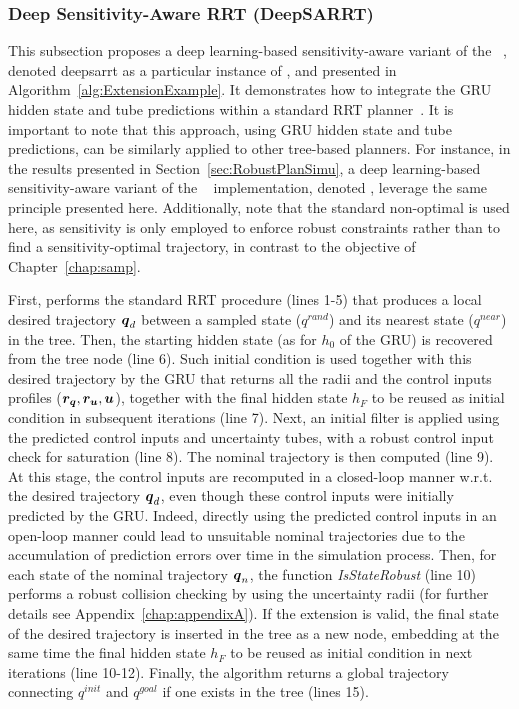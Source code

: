 \subsubsection{Deep Sensitivity-Aware RRT (DeepSARRT)}

This subsection proposes a deep learning-based sensitivity-aware variant of the ~\cite{cRRT}, denoted \gls{deepsarrt} as a particular instance of , and presented in Algorithm~\ref{alg:ExtensionExample}. 
It demonstrates how to integrate the GRU hidden state and tube predictions within a standard RRT planner~\cite{cRRT}.
It is important to note that this approach, using GRU hidden state and tube predictions, can be similarly applied to other tree-based planners. 
For instance, in the results presented in Section~\ref{sec:RobustPlanSimu}, a deep learning-based sensitivity-aware variant of the ~\cite{cRRTstar} implementation, denoted , leverage the same principle presented here.
Additionally, note that the standard non-optimal  is used here, as sensitivity is only employed to enforce robust constraints rather than to find a sensitivity-optimal trajectory, in contrast to the objective of Chapter~\ref{chap:samp}.

First,  performs the standard RRT procedure (lines 1-5) that produces a local desired trajectory $\boldsymbol{q}_d$ between a sampled state (${q}^{rand}$) and its nearest state (${q}^{near}$) in the tree. 
Then, the starting hidden state (as for $h_{0}$ of the GRU) is recovered from the tree node (line 6).
Such initial condition is used together with this desired trajectory by the GRU that returns all the radii and the control inputs profiles ($\boldsymbol{r_q},\boldsymbol{r_u},\boldsymbol{u}$), together with the final hidden state $h_{F}$ to be reused as initial condition in subsequent iterations (line 7).
Next, an initial filter is applied using the predicted control inputs and uncertainty tubes, with a robust control input check for saturation (line 8).
The nominal trajectory is then computed (line 9). 
At this stage, the control inputs are recomputed in a closed-loop manner w.r.t. the desired trajectory $\boldsymbol{q}_d$, even though these control inputs were initially predicted by the GRU.
Indeed, directly using the predicted control inputs in an open-loop manner could lead to unsuitable nominal trajectories due to the accumulation of prediction errors over time in the simulation process.
Then, for each state of the nominal trajectory $\boldsymbol{q}_{n}$, the function \emph{IsStateRobust} (line 10) performs a robust collision checking by using the uncertainty radii (for further details see Appendix~\ref{chap:appendixA}).
If the extension is valid, the final state of the desired trajectory is inserted in the tree as a new node, embedding at the same time the final hidden state $h_{F}$ to be reused as initial condition in next iterations (line 10-12).
Finally, the algorithm returns a global trajectory connecting ${q}^{init}$ and ${q}^{goal}$ if one exists in the tree (lines 15).

